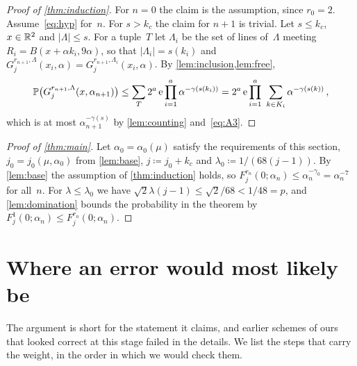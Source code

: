 \documentclass[11pt,letterpaper]{article}
\begin{document}
\begin{proof}[Proof of \cref{thm:induction}]
For $n=0$ the claim is the assumption, since $r_0=2$. Assume~\eqref{eq:hyp} for~$n$. For $s>k_c$ the claim for $n+1$ is trivial. Let $s\le k_c$, $x\in\mathbb R^2$ and $\lvert\Lambda\rvert\le s$. For a tuple~$T$ let $\Lambda_i$ be the set of lines of~$\Lambda$ meeting $R_i=B(x+\alpha k_i,9\alpha)$, so that $\lvert\Lambda_i\rvert=s(k_i)$ and $G_j^{r_{n+1},\Lambda}(x_i,\alpha)=G_j^{r_{n+1},\Lambda_i}(x_i,\alpha)$. By \cref{lem:inclusion,lem:free},
\begin{equation*}
  \P\bigl(G_j^{r_{n+1},\Lambda}(x,\alpha_{n+1})\bigr)\le\sum_T2^a\,\e\prod_{i=1}^a\alpha^{-\gamma(s(k_i))}=2^a\,\e\prod_{i=1}^a\ \sum_{k\in K_i}\alpha^{-\gamma(s(k))}\,,
\end{equation*}
which is at most $\alpha_{n+1}^{-\gamma(s)}$ by \cref{lem:counting} and~\eqref{eq:A3}.
\end{proof}

\begin{proof}[Proof of \cref{thm:main}]
Let $\alpha_0=\alpha_0(\mu)$ satisfy the requirements of this section, $j_0=j_0(\mu,\alpha_0)$ from \cref{lem:base}, $j\coloneqq j_0+k_c$ and $\lambda_0\coloneqq1/(68(j-1))$. By \cref{lem:base} the assumption of \cref{thm:induction} holds, so $F_j^{r_n}(0;\alpha_n)\le\alpha_n^{-\gamma_0}=\alpha_n^{-7}$ for all~$n$. For $\lambda\le\lambda_0$ we have $\sqrt2\lambda(j-1)\le\sqrt2/68<1/48=p$, and \cref{lem:domination} bounds the probability in the theorem by $F_j^1(0;\alpha_n)\le F_j^{r_n}(0;\alpha_n)$.
\end{proof}

\section{Where an error would most likely be}
\label{sec:audit}

The argument is short for the statement it claims, and earlier schemes of ours that looked correct at this stage failed in the details. We list the steps that carry the weight, in the order in which we would check them.
\end{document}
